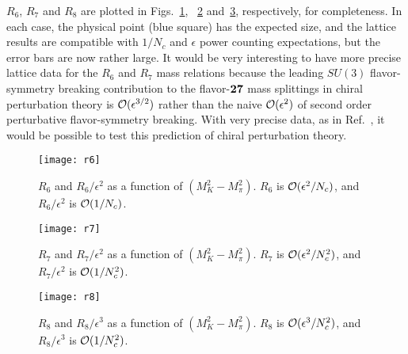 \documentclass[twocolumn,nofootinbib,prd,aps,superscriptaddress,tightenlines]{revtex4}
\begin{document}
$R_{6}$, $R_7$ and $R_8$ are plotted in Figs.~\ref{fig:r6}, ~\ref{fig:r7} and~\ref{fig:r8}, respectively, for completeness. In each case, the physical point (blue square) has the expected size, and the lattice results are compatible with $1/N_c$ and $\epsilon$ power counting expectations, but the error bars are now rather large.  It would be very interesting to have more precise lattice data for the $R_6$ and $R_7$ mass relations because the
leading $SU(3)$ flavor-symmetry breaking contribution to the flavor-${\bf 27}$ mass splittings in chiral perturbation theory is ${\cal O}(\epsilon^{3/2})$ rather than the naive ${\cal O}(\epsilon^2)$ of second order perturbative flavor-symmetry breaking.  With very precise data, as in Ref.~\cite{Beane:2009ky}, it would be
possible to test this prediction of chiral perturbation theory.  
\begin{figure}
\texttt{[image: r6]}
\caption{$R_6$ and $R_6/\epsilon^2$ as a function of $(M_K^2 - M_\pi^2)$.  $R_6$ is ${\cal O}(\epsilon^2/N_c)$, and $R_6/\epsilon^2$ is ${\cal O}(1/N_c)$. \label{fig:r6}}
\end{figure}

\begin{figure}
\texttt{[image: r7]}
\caption{$R_7$ and $R_7/\epsilon^2$ as a function of $(M_K^2 - M_\pi^2)$. $R_7$ is ${\cal O}(\epsilon^2/N_c^2)$, and $R_7/\epsilon^2$ is ${\cal O}(1/N_c^2)$. \label{fig:r7}}
\end{figure}

\begin{figure}
\texttt{[image: r8]}
\caption{$R_8$ and $R_8/\epsilon^3$ as a function of $(M_K^2 - M_\pi^2)$. $R_8$ is ${\cal O}(\epsilon^3/N_c^2)$, and $R_8/\epsilon^3$ is ${\cal O}(1/N_c^2)$. \label{fig:r8}}
\end{figure}
\end{document}
